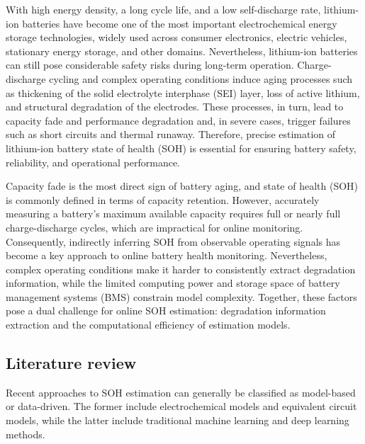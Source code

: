 With high energy density, a long cycle life, and a low self-discharge rate, lithium-ion batteries have become one of the most important electrochemical energy storage technologies, widely used across consumer electronics, electric vehicles, stationary energy storage, and other domains\cite{ref1,ref2,ref3,ref4}. Nevertheless, lithium-ion batteries can still pose considerable safety risks during long-term operation. Charge-discharge cycling and complex operating conditions induce aging processes such as thickening of the solid electrolyte interphase (SEI) layer, loss of active lithium, and structural degradation of the electrodes\cite{ref5,ref6}. These processes, in turn, lead to capacity fade and performance degradation and, in severe cases, trigger failures such as short circuits and thermal runaway\cite{ref7,ref8}. Therefore, precise estimation of lithium-ion battery state of health (SOH) is essential for ensuring battery safety, reliability, and operational performance.

Capacity fade is the most direct sign of battery aging, and state of health (SOH) is commonly defined in terms of capacity retention\cite{ref13}. However, accurately measuring a battery's maximum available capacity requires full or nearly full charge-discharge cycles, which are impractical for online monitoring\cite{ref10}. Consequently, indirectly inferring SOH from observable operating signals has become a key approach to online battery health monitoring. Nevertheless, complex operating conditions make it harder to consistently extract degradation information, while the limited computing power and storage space of battery management systems (BMS) constrain model complexity. Together, these factors pose a dual challenge for online SOH estimation: degradation information extraction and the computational efficiency of estimation models.

\subsection{Literature review}

Recent approaches to SOH estimation can generally be classified as model-based or data-driven\cite{ref12}. The former include electrochemical models and equivalent circuit models, while the latter include traditional machine learning and deep learning methods.


